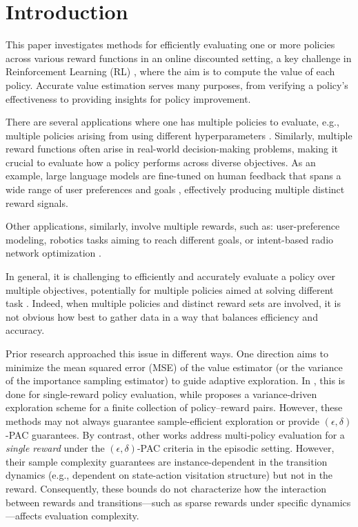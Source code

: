 \section{Introduction}\label{sec:introduction}
This paper investigates methods for efficiently evaluating one or more policies across various reward functions in an online discounted setting, a key challenge in Reinforcement Learning (RL) \cite{sutton2018reinforcement}, where the aim is to compute the value of each policy. Accurate value estimation serves many purposes, from verifying a policy’s effectiveness to providing insights for policy improvement.


There are several applications where one has multiple policies to evaluate, e.g.,  multiple policies arising from using different hyperparameters \cite{dann2023reinforcement,chen2024multiple,poddarpersonalizing}. Similarly, multiple reward functions often arise in real-world decision-making problems, making it crucial to evaluate how a policy performs across diverse objectives. As an example, large language models \cite{brown2020language} are fine-tuned on human feedback that spans a wide range of user preferences and goals \cite{ziegler2019fine,rafailov2024direct,poddarpersonalizing}, effectively producing multiple distinct reward signals. 

Other applications, similarly, involve multiple rewards, such as: user-preference modeling, robotics tasks aiming to reach different goals, or intent-based radio network optimization \cite{nahum2023intent, de2023towards, russomulti,poddarpersonalizing}.



In general, it is challenging to efficiently and accurately
evaluate a policy over multiple objectives, potentially for
multiple policies aimed at solving different task \cite{sutton2011horde,mcleod2021continual,jain2024adaptive}. Indeed, when multiple policies and distinct reward sets are involved, it is not obvious how best to gather data in a way that balances efficiency and accuracy.


Prior research approached this issue in different ways. One direction aims to minimize the mean squared error (MSE) of the value estimator (or the variance of the importance sampling estimator) to guide adaptive exploration. In \cite{hanna2017data}, this is done for single-reward policy evaluation, while \cite{jain2024adaptive} proposes a variance-driven exploration scheme for a finite collection of policy–reward pairs. However, these methods may not always guarantee sample-efficient exploration or provide $(\epsilon,\delta)$-PAC guarantees. By contrast, other works \cite{dann2023reinforcement,chen2024multiple} address multi-policy evaluation for a \emph{single reward} under the $(\epsilon,\delta)$-PAC criteria in the episodic setting. However, their sample complexity guarantees are instance-dependent in the transition dynamics (e.g., dependent on state-action visitation structure) but not in the reward. Consequently, these bounds do not characterize how the interaction between rewards and transitions—such as sparse rewards under specific dynamics—affects evaluation complexity. 


